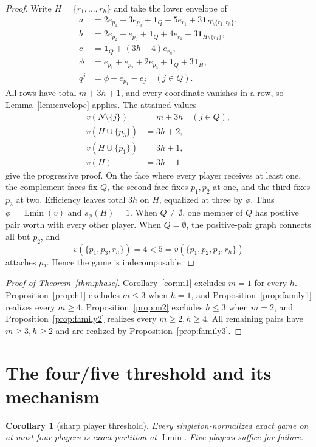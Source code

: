 \documentclass[11pt]{article}
\newtheorem{corollary}[theorem]{Corollary}
\newcommand{\Lmin}{\operatorname{Lmin}}
\newcommand{\one}{\mathbf 1}
\begin{document}
\begin{proof}
Write $H=\{r_1,\ldots,r_h\}$ and take the lower envelope of
\begin{align*}
 a&=2e_{p_1}+3e_{p_3}+\one_Q+5e_{r_1}
       +3\one_{H\setminus\{r_1,r_h\}},\\
 b&=2e_{p_2}+e_{p_3}+\one_Q+4e_{r_1}
       +3\one_{H\setminus\{r_1\}},\\
 c&=\one_Q+(3h+4)e_{r_h},\\
 \phi&=e_{p_1}+e_{p_2}+2e_{p_3}+\one_Q+3\one_H,\\
 q^j&=\phi+e_{p_1}-e_j\quad(j\in Q).
\end{align*}
All rows have total $m+3h+1$, and every coordinate vanishes in a row, so
Lemma~\ref{lem:envelope} applies.  The attained values
\begin{align*}
 v(N\setminus\{j\})&=m+3h\quad(j\in Q),\\
 v(H\cup\{p_3\})&=3h+2,\\
 v(H\cup\{p_1\})&=3h+1,\\
 v(H)&=3h-1
\end{align*}
give the progressive proof.  On the face where every player receives at
least one, the complement faces fix $Q$, the second face fixes $p_1,p_2$ at
one, and the third fixes $p_3$ at two.  Efficiency leaves total $3h$ on
$H$, equalized at three by $\phi$.  Thus $\phi=\Lmin(v)$ and $s_\phi(H)=1$.
When $Q\ne\emptyset$, one member of $Q$ has positive pair worth with every
other player.  When $Q=\emptyset$, the positive-pair graph connects all but
$p_2$, and
\[
 v(\{p_1,p_3,r_h\})=4<5=v(\{p_1,p_2,p_3,r_h\})
\]
attaches $p_2$.  Hence the game is indecomposable.
\end{proof}

\begin{proof}[Proof of Theorem~\ref{thm:phase}]
Corollary~\ref{cor:m1} excludes $m=1$ for every $h$.
Proposition~\ref{prop:h1} excludes $m\le3$ when $h=1$, and
Proposition~\ref{prop:family1} realizes every $m\ge4$.
Proposition~\ref{prop:m2} excludes $h\le3$ when $m=2$, and
Proposition~\ref{prop:family2} realizes every $m\ge2,h\ge4$.
All remaining pairs have $m\ge3,h\ge2$ and are realized by
Proposition~\ref{prop:family3}.
\end{proof}

\section{The four/five threshold and its mechanism}

\begin{corollary}[sharp player threshold]\label{cor:fourfive}
Every singleton-normalized exact game on at most four players is exact
partition at $\Lmin$.  Five players suffice for failure.
\end{corollary}
\end{document}
